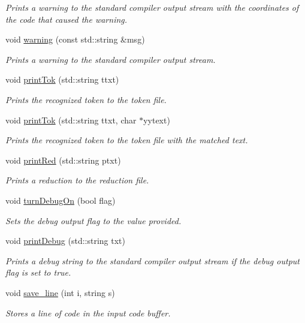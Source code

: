 \begin{DoxyCompactItemize}
\begin{DoxyCompactList}\small\item\em Prints a warning to the standard compiler output stream with the coordinates of the code that caused the warning. \end{DoxyCompactList}\item 
void \hyperlink{classCCompiler_a763a49b094c39f1105cb41be54b3cb13}{warning} (const std\-::string \&msg)
\begin{DoxyCompactList}\small\item\em Prints a warning to the standard compiler output stream. \end{DoxyCompactList}\item 
void \hyperlink{classCCompiler_a9b22e2e590320adbb31fcd74981e1bf5}{print\-Tok} (std\-::string ttxt)
\begin{DoxyCompactList}\small\item\em Prints the recognized token to the token file. \end{DoxyCompactList}\item 
void \hyperlink{classCCompiler_a14c4d23d93ef5efb73d7d6dba3e9689e}{print\-Tok} (std\-::string ttxt, char $\ast$yytext)
\begin{DoxyCompactList}\small\item\em Prints the recognized token to the token file with the matched text. \end{DoxyCompactList}\item 
void \hyperlink{classCCompiler_a8067a904454b386b22f4a76c2fa153b7}{print\-Red} (std\-::string ptxt)
\begin{DoxyCompactList}\small\item\em Prints a reduction to the reduction file. \end{DoxyCompactList}\item 
void \hyperlink{classCCompiler_a8098c8e8071444110d5a517d7fa172a8}{turn\-Debug\-On} (bool flag)
\begin{DoxyCompactList}\small\item\em Sets the debug output flag to the value provided. \end{DoxyCompactList}\item 
void \hyperlink{classCCompiler_ad05b354c2c416543d9238c9d8203a0f2}{print\-Debug} (std\-::string txt)
\begin{DoxyCompactList}\small\item\em Prints a debug string to the standard compiler output stream if the debug output flag is set to true. \end{DoxyCompactList}\item 
void \hyperlink{classCCompiler_a29d69476eff6dba6b2697b065b7fbc6b}{save\-\_\-line} (int i, string s)
\begin{DoxyCompactList}\small\item\em Stores a line of code in the input code buffer. \end{DoxyCompactList}\end{DoxyCompactItemize}
